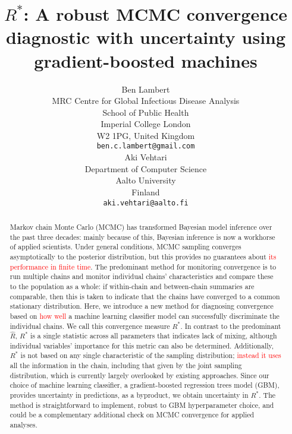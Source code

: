 \documentclass{article}
\title{$R^*$: A robust MCMC convergence diagnostic with uncertainty using gradient-boosted machines}
\author{%
	 Ben Lambert\\
	 MRC Centre for Global Infectious Disease Analysis\\
	 School of Public Health\\
	 Imperial College London\\
	 W2 1PG, United Kingdom\\
	 \texttt{ben.c.lambert@gmail.com} \\
	 \And
	 Aki Vehtari \\
	 Department of Computer Science\\
	 Aalto University\\
	 Finland\\
	 \texttt{aki.vehtari@aalto.fi}
}
\begin{document}

\maketitle

\begin{abstract}
	Markov chain Monte Carlo (MCMC) has transformed Bayesian model inference over the past three decades: mainly because of this, Bayesian inference is now a workhorse of applied scientists. Under general conditions, MCMC sampling converges asymptotically to the posterior distribution, but this provides no guarantees about \textcolor{red}{its performance in finite time}. The predominant method for monitoring convergence is to run multiple chains and monitor individual chains' characteristics and compare these to the population as a whole: if within-chain and between-chain summaries are comparable, then this is taken to indicate that the chains have converged to a common stationary distribution. Here, we introduce a new method for diagnosing convergence based on \textcolor{red}{how well} a machine learning classifier model can successfully discriminate the individual chains. We call this convergence measure $R^*$. In contrast to the predominant $\widehat{R}$, $R^*$ is a single statistic across all parameters that indicates lack of mixing, although individual variables' importance for this metric can also be determined. Additionally, $R^*$ is not based on any single characteristic of the sampling distribution; \textcolor{red}{instead it uses} all the information in the chain, including that given by the joint sampling distribution, which is currently largely overlooked by existing approaches. Since our choice of machine learning classifier, a gradient-boosted regression trees model (GBM), provides uncertainty in predictions, as a byproduct, we obtain uncertainty in $R^*$. The method is straightforward to implement, robust to GBM hyperparameter choice, and could be a complementary additional check on MCMC convergence for applied analyses.
\end{abstract}
\end{document}
